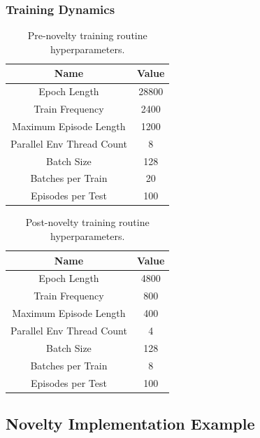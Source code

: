 \subsubsection{Training Dynamics}

\begin{table}[htbp]
    \centering
    \begin{tabular}{cc}
    \toprule
        Name &  Value  \\
    \midrule
        Epoch Length     & 28800\\
        Train Frequency  & 2400 \\
        Maximum Episode Length & 1200 \\
        Parallel Env Thread Count & 8 \\
        Batch Size       & 128 \\
        Batches per Train & 20 \\
        Episodes per Test & 100 \\
    \bottomrule
    \end{tabular}
    \caption{Pre-novelty training routine hyperparameters.}
    \label{tab:pre-n-train-hyper}
\end{table}

\begin{table}[htbp]
    \centering
    \begin{tabular}{cc}
    \toprule
        Name &  Value  \\
    \midrule
        Epoch Length     & 4800\\
        Train Frequency  & 800 \\
        Maximum Episode Length & 400 \\
        Parallel Env Thread Count & 4 \\
        Batch Size       & 128 \\
        Batches per Train & 8 \\
        Episodes per Test & 100 \\
    \bottomrule
    \end{tabular}
    \caption{Post-novelty training routine hyperparameters.}
    \label{tab:post-n-train-hyper}
\end{table}


\subsection{Novelty Implementation Example}
\label{sec:ng_novelty_example}

